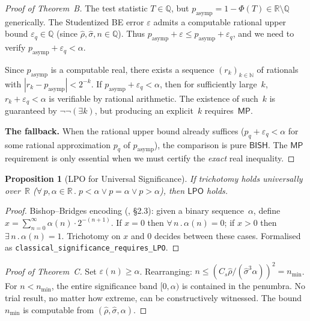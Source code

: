 \documentclass[11pt,a4paper]{article}
\theoremstyle{plain}
\newtheorem{proposition}[theorem]{Proposition}
\theoremstyle{definition}
\newcommand{\BISH}{\textsf{BISH}}
\newcommand{\LPO}{\textsf{LPO}}
\newcommand{\MP}{\textsf{MP}}
\newcommand{\Q}{\mathbb{Q}}
\newcommand{\R}{\mathbb{R}}
\newcommand{\N}{\mathbb{N}}
\renewcommand{\Phi}{\varPhi}
\begin{document}
\begin{proof}[Proof of Theorem~B]
The test statistic $T \in \Q$, but $p_{\mathrm{asymp}} = 1 - \Phi(T) \in \R \setminus \Q$ generically.  The Studentized BE error $\varepsilon$ admits a computable rational upper bound $\varepsilon_q \in \Q$ (since $\hat\rho, \hat\sigma, n \in \Q$).  Thus $p_{\mathrm{asymp}} + \varepsilon \leq p_{\mathrm{asymp}} + \varepsilon_q$, and we need to verify $p_{\mathrm{asymp}} + \varepsilon_q < \alpha$.

Since $p_{\mathrm{asymp}}$ is a computable real, there exists a sequence $(r_k)_{k \in \N}$ of rationals with $|r_k - p_{\mathrm{asymp}}| < 2^{-k}$.  If $p_{\mathrm{asymp}} + \varepsilon_q < \alpha$, then for sufficiently large~$k$, $r_k + \varepsilon_q < \alpha$ is verifiable by rational arithmetic.  The existence of such~$k$ is guaranteed by $\lnot\lnot(\exists k)$, but producing an explicit~$k$ requires~$\MP$.

\smallskip
\noindent\textbf{The fallback.}  When the rational upper bound already suffices ($p_q + \varepsilon_q < \alpha$ for some rational approximation $p_q$ of $p_{\mathrm{asymp}}$), the comparison is pure $\BISH$.  The $\MP$ requirement is only essential when we must certify the \emph{exact} real inequality.
\end{proof}

\begin{proposition}[LPO for Universal Significance]\label{prop:lpo}
If trichotomy holds universally over~$\R$ ($\forall\, p, \alpha \in \R\,.\; p < \alpha \lor p = \alpha \lor p > \alpha$), then $\LPO$ holds.
\end{proposition}

\begin{proof}
Bishop--Bridges encoding (\cite{bishop-bridges}, \S2.3): given a binary sequence~$\alpha$, define $x = \sum_{n=0}^{\infty} \alpha(n) \cdot 2^{-(n+1)}$.  If $x = 0$ then $\forall\, n\,.\, \alpha(n) = 0$; if $x > 0$ then $\exists\, n\,.\, \alpha(n) = 1$.  Trichotomy on $x$ and $0$ decides between these cases.  Formalised as \texttt{classical\_significance\_requires\_LPO}.
\end{proof}

\begin{proof}[Proof of Theorem~C]
Set $\varepsilon(n) \geq \alpha$.  Rearranging: $n \leq (C_s \hat\rho / (\hat\sigma^3 \alpha))^2 = n_{\min}$.  For $n < n_{\min}$, the entire significance band $[0, \alpha)$ is contained in the penumbra.  No trial result, no matter how extreme, can be constructively witnessed.  The bound $n_{\min}$ is computable from $(\hat\rho, \hat\sigma, \alpha)$.
\end{proof}
\end{document}
